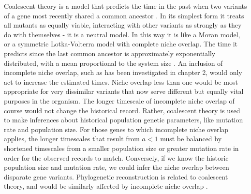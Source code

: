 Coalescent theory is a model that predicts the time in the past when two variants of a gene most recently shared a common ancestor \cite{Kingman1982,Rouzine2001,Blythe2007,Rogers2014}. 
In its simplest form it treats all mutants as equally viable, interacting with other variants as strongly as they do with themselves \cite{Ricklefs2006,Rosindell2011} - it is a neutral model. %
In this way it is like a Moran model, or a symmetric Lotka-Volterra model with complete niche overlap. 
The time it predicts since the last common ancestor is approximately exponentially distributed, with a mean proportional to the system size \cite{Kingman1982}. %
An inclusion of incomplete niche overlap, such as has been investigated in chapter 2, would only act to increase the estimated times. 
Niche overlap less than one would be most appropriate for very dissimilar variants that now serve different but equally vital purposes in the organism. 
The longer timescale of incomplete niche overlap of course would not change the historical record. 
Rather, coalescent theory is used to make inferences about historical population genetic parameters, like mutation rate and population size. 
For those genes to which incomplete niche overlap applies, the longer timescales that result from $a<1$ must be balanced by shortened timescales from a smaller population size or greater mutation rate in order for the observed records to match. 
Conversely, if we know the historic population size and mutation rate, we could infer the niche overlap between disparate gene variants. 
Phylogenetic reconstruction is related to coalescent theory, and would be similarly affected by incomplete niche overlap \cite{Ricklefs2006}. %


